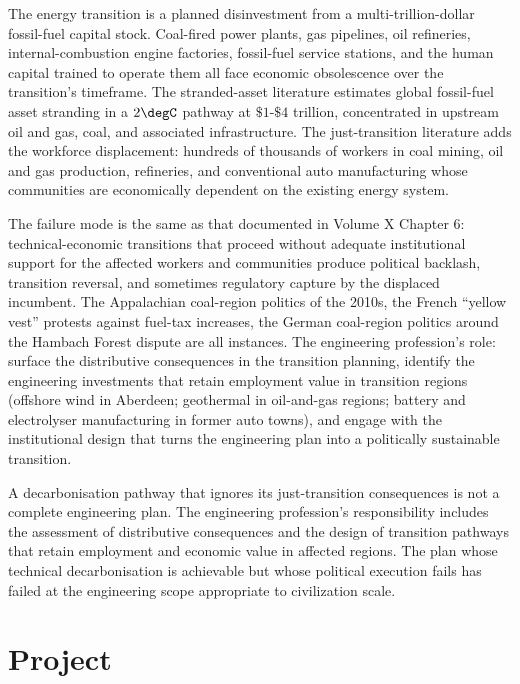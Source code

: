 The energy transition is a planned disinvestment from a multi-trillion-dollar fossil-fuel capital stock. Coal-fired power plants, gas pipelines, oil refineries, internal-combustion engine factories, fossil-fuel service stations, and the human capital trained to operate them all face economic obsolescence over the transition's timeframe. The stranded-asset literature \cite{paper:mccollum-stranded-2018} estimates global fossil-fuel asset stranding in a $2\degC$ pathway at $\$1$-$\$4$ trillion, concentrated in upstream oil and gas, coal, and associated infrastructure. The just-transition literature \cite{paper:newell-mulvaney-2013} adds the workforce displacement: hundreds of thousands of workers in coal mining, oil and gas production, refineries, and conventional auto manufacturing whose communities are economically dependent on the existing energy system.

The failure mode is the same as that documented in Volume X Chapter 6: technical-economic transitions that proceed without adequate institutional support for the affected workers and communities produce political backlash, transition reversal, and sometimes regulatory capture by the displaced incumbent. The Appalachian coal-region politics of the 2010s, the French ``yellow vest'' protests against fuel-tax increases, the German coal-region politics around the Hambach Forest dispute are all instances. The engineering profession's role: surface the distributive consequences in the transition planning, identify the engineering investments that retain employment value in transition regions (offshore wind in Aberdeen; geothermal in oil-and-gas regions; battery and electrolyser manufacturing in former auto towns), and engage with the institutional design that turns the engineering plan into a politically sustainable transition.

\begin{principle}
A decarbonisation pathway that ignores its just-transition consequences is not a complete engineering plan. The engineering profession's responsibility includes the assessment of distributive consequences and the design of transition pathways that retain employment and economic value in affected regions. The plan whose technical decarbonisation is achievable but whose political execution fails has failed at the engineering scope appropriate to civilization scale.
\end{principle}

\section{Project}

